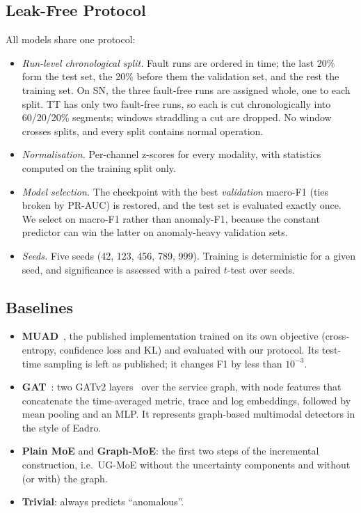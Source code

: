 \documentclass[journal]{IEEEtran}
\newcommand{\ugmoe}{UG-MoE}
\begin{document}
\subsection{Leak-Free Protocol}
All models share one protocol:
\begin{itemize}
  \item \emph{Run-level chronological split.} Fault runs are ordered in time; the last 20\% form the test set,
  the 20\% before them the validation set, and the rest the training set. On SN, the three fault-free runs are
  assigned whole, one to each split. TT has only two fault-free runs, so each is cut chronologically into
  60/20/20\% segments; windows straddling a cut are dropped. No window crosses splits, and every split
  contains normal operation.
  \item \emph{Normalisation.} Per-channel z-scores for every modality, with statistics computed on the
  training split only.
  \item \emph{Model selection.} The checkpoint with the best \emph{validation} macro-F1 (ties broken by PR-AUC)
  is restored, and the test set is evaluated exactly once. We select on macro-F1 rather than anomaly-F1,
  because the constant predictor can win the latter on anomaly-heavy validation sets.
  \item \emph{Seeds.} Five seeds (42, 123, 456, 789, 999). Training is deterministic for a given seed, and
  significance is assessed with a paired $t$-test over seeds.
\end{itemize}

\subsection{Baselines}
\begin{itemize}
  \item \textbf{MUAD}~\cite{dou2026muad}, the published implementation trained on its own objective
  (cross-entropy, confidence loss and KL) and evaluated with our protocol. Its test-time sampling is left
  as published; it changes F1 by less than $10^{-3}$.
  \item \textbf{GAT}~\cite{velickovic2018gat}: two GATv2 layers~\cite{brody2022gatv2} over the service graph, with node features that
  concatenate the time-averaged metric, trace and log embeddings, followed by mean pooling and an MLP. It
  represents graph-based multimodal detectors in the style of Eadro.
  \item \textbf{Plain MoE} and \textbf{Graph-MoE}: the first two steps of the incremental construction, i.e.\
  \ugmoe{} without the uncertainty components and without (or with) the graph.
  \item \textbf{Trivial}: always predicts ``anomalous''.
\end{itemize}
\end{document}
